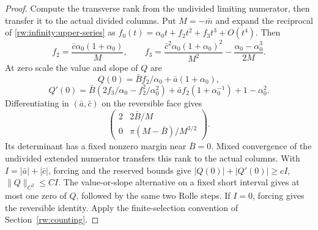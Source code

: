 \begin{proof}
Compute the transverse rank from the undivided limiting numerator,
then transfer it to the actual divided columns.
Put $M=-\bar m$ and expand the reciprocal of
\eqref{rw:infinity:upper-series} as
$f_0(t)=\alpha_0t+f_2t^2+f_3t^3+O(t^4)$. Then
\[
 f_2=\frac{\bar c\alpha_0(1+\alpha_0)}M,\qquad
 f_3=\frac{\bar c^2\alpha_0(1+\alpha_0)^2}{M^2}
                -\frac{\alpha_0-\alpha_0^3}{2M}.
\]
At zero scale the value and slope of $Q$ are
\[
 Q(0)=\bar B f_2/\alpha_0+\bar a(1+\alpha_0),
\]
\[
 Q'(0)=\bar B(2f_3/\alpha_0-f_2^2/\alpha_0^2)
       +\bar af_2(1+\alpha_0^{-1})+1-\alpha_0^2.
\]
Differentiating in $(\bar a,\bar c)$ on the reversible face gives
\[
 \begin{pmatrix}2&2\bar B/M\\
 0&\pi(M-\bar B)/M^{3/2}\end{pmatrix}.
\]
Its determinant has a fixed nonzero margin near $\bar B=0$.
Mixed convergence of the undivided extended numerator transfers this
rank to the actual columns. With
$I=|\bar a|+|\bar c|$, forcing and the reserved bounds give
$|Q(0)|+|Q'(0)|\ge cI$, $\|Q\|_{C^2}\le CI$.
The value-or-slope alternative on a fixed short interval gives at most
one zero of $Q$, followed by the same two Rolle steps. If $I=0$,
forcing gives the reversible identity. Apply the finite-selection
convention of Section~\ref{rw:counting}.
\end{proof}
